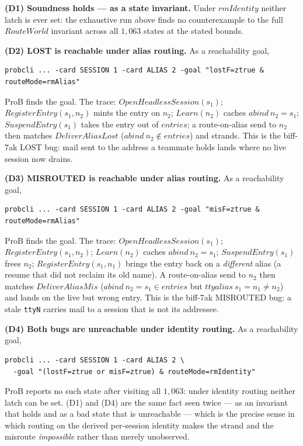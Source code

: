 \documentclass[a4paper,10pt,fleqn]{article}
\begin{document}
\medskip\noindent\textbf{(D1) Soundness holds --- as a state invariant.}
Under $rmIdentity$ neither latch is ever set: the exhaustive run above
finds no counterexample to the full $RouteWorld$ invariant across all
$1{,}063$ states at the stated bounds.

\medskip\noindent\textbf{(D2) LOST is reachable under alias routing.}
As a reachability goal,

\begin{verbatim}
probcli ... -card SESSION 1 -card ALIAS 2 -goal "lostF=ztrue & routeMode=rmAlias"
\end{verbatim}

ProB finds the goal.  The trace: $OpenHeadlessSession(s_1)$;
$RegisterEntry(s_1, n_2)$ mints the entry on $n_2$;
$Learn(n_2)$ caches $abind~n_2 = s_1$; $SuspendEntry(s_1)$
takes the entry out of $entries$; a route-on-alias send to $n_2$ then
matches $DeliverAliasLost$ ($abind~n_2 \notin entries$) and strands.  This
is the biff-7ak LOST bug: mail sent to the address a teammate holds lands
where no live session now drains.

\medskip\noindent\textbf{(D3) MISROUTED is reachable under alias
routing.}  As a reachability goal,

\begin{verbatim}
probcli ... -card SESSION 1 -card ALIAS 2 -goal "misF=ztrue & routeMode=rmAlias"
\end{verbatim}

ProB finds the goal.  The trace: $OpenHeadlessSession(s_1)$;
$RegisterEntry(s_1, n_2)$; $Learn(n_2)$ caches $abind~n_2 =
s_1$; $SuspendEntry(s_1)$ frees $n_2$;
$RegisterEntry(s_1, n_1)$ brings the entry back on a
\emph{different} alias (a resume that did not reclaim its old name).  A
route-on-alias send to $n_2$ then matches $DeliverAliasMis$
($abind~n_2 = s_1 \in entries$ but $ttyalias~s_1 = n_1
\neq n_2$) and lands on the live but wrong entry.  This is the biff-7ak
MISROUTED bug: a stale \texttt{ttyN} carries mail to a session that is
not its addressee.

\medskip\noindent\textbf{(D4) Both bugs are unreachable under identity
routing.}  As a reachability goal,

\begin{verbatim}
probcli ... -card SESSION 1 -card ALIAS 2 \
  -goal "(lostF=ztrue or misF=ztrue) & routeMode=rmIdentity"
\end{verbatim}

ProB reports no such state after visiting all $1{,}063$: under identity
routing neither latch can be set.  (D1) and (D4) are the same fact seen
twice --- as an invariant that holds and as a bad state that is
unreachable --- which is the precise sense in which routing on the
derived per-session identity makes the strand and the misroute
\emph{impossible} rather than merely unobserved.
\end{document}
